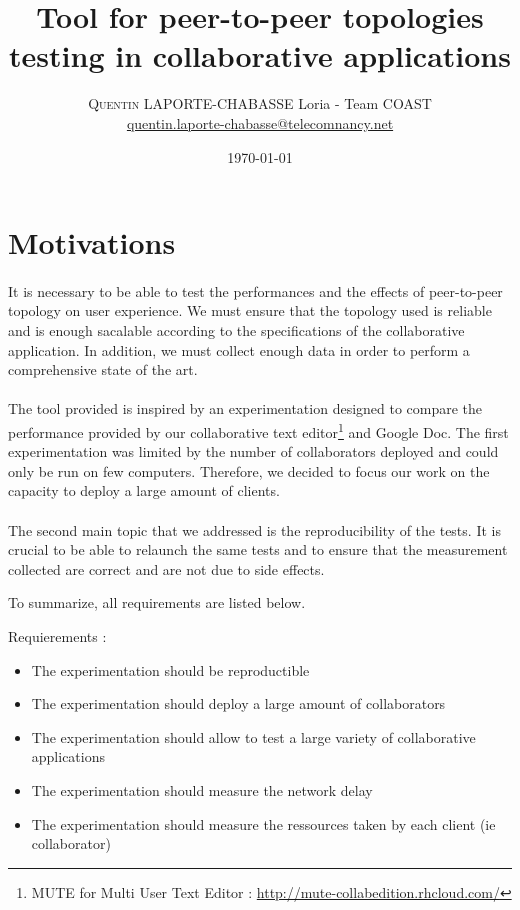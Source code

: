 \documentclass[twoside,twocolumn]{article}
\title{Tool for peer-to-peer topologies testing in collaborative applications} %
\author{
\textsc{Quentin LAPORTE-CHABASSE}
\normalsize Loria - Team COAST \\ %
\normalsize \href{mailto:quentin.laporte-chabasse@telecomnancy.net}{quentin.laporte-chabasse@telecomnancy.net} %
}
\date{\today}
\begin{document}
\maketitle


\section{Motivations}
\paragraph{}
It is necessary to be able to test the performances and the effects of peer-to-peer topology on user experience.
We must ensure that the topology used is reliable and is enough sacalable according to the specifications of the collaborative application.
In addition, we must collect enough data in order to perform a comprehensive state of the art.
\paragraph{}
The tool provided is inspired by an experimentation designed to compare the performance provided by our collaborative text editor\footnote{MUTE for Multi User Text Editor : \url{http://mute-collabedition.rhcloud.com/} } and Google Doc.
The first experimentation was limited by the number of collaborators deployed and could only be run on few computers. Therefore, we decided to focus our work on the capacity to deploy a
large amount of clients.
\paragraph{}
The second main topic that we addressed is the reproducibility of the tests. It is crucial to be able to relaunch the same tests and to ensure that the measurement collected are correct
and are not due to side effects.

To summarize, all requirements are listed below.

Requierements :
\begin{itemize}
  \item The experimentation should be reproductible
  \item The experimentation should deploy a large amount of collaborators
  \item The experimentation should allow to test a large variety of collaborative applications
  \item The experimentation should measure the network delay
  \item The experimentation should measure the ressources taken by each client (ie collaborator)
\end{itemize}
\end{document}
